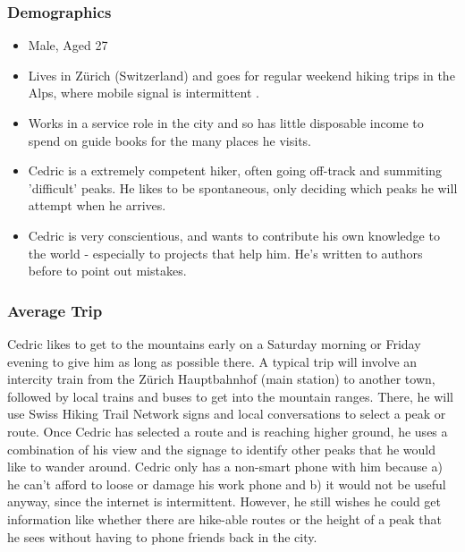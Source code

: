\documentclass{article}
\begin{document}
\subsubsection{Demographics}
\begin{itemize}
  \item Male, Aged 27
  \item Lives in Zürich (Switzerland) and goes for regular weekend hiking trips in the Alps, where mobile signal is intermittent .
  \item Works in a service role in the city and so has little disposable income to spend on guide books for the many places he visits.
  \item Cedric is a extremely competent hiker, often going off-track and summiting 'difficult' peaks.  He likes to be spontaneous, only deciding which peaks he will attempt when he arrives.
  \item Cedric is very conscientious, and wants to contribute his own knowledge to the world - especially to projects that help him.  He's written to authors before to point out mistakes.
\end{itemize}
\subsubsection{Average Trip}
Cedric likes to get to the mountains early on a Saturday morning or Friday evening to give him as long as possible there.  A typical trip will involve an intercity train from the Zürich Hauptbahnhof (main station) to another town, followed by local trains and buses to get into the mountain ranges.  There, he will use Swiss Hiking Trail Network signs and local conversations to select a peak or route.  Once Cedric has selected a route and is reaching higher ground, he uses a combination of his view and the signage to identify other peaks that he would like to wander around.  Cedric only has a non-smart phone with him because a) he can't afford to loose or damage his work phone and b) it would not be useful anyway, since the internet is intermittent.  However, he still wishes he could get information like whether there are hike-able  routes or the height of a peak that he sees without having to phone friends back in the city.
\end{document}
